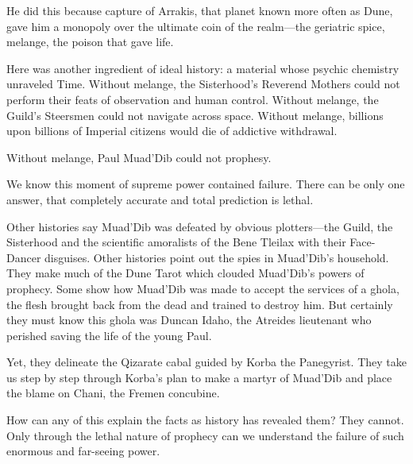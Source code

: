 \documentclass[a4paper, 12pt, oldfontcommands, final]{memoir}
\begin{document}
He did this because capture of Arrakis, that planet known more often as Dune, gave him a monopoly over the ultimate coin of the realm---the geriatric spice, melange, the poison that gave life.

Here was another ingredient of ideal history: a material whose psychic chemistry unraveled Time. Without melange, the Sisterhood's Reverend Mothers could not perform their feats of observation and human control. Without melange, the Guild’s Steersmen could not navigate across space. Without melange, billions upon billions of Imperial citizens would die of addictive withdrawal.

Without melange, Paul Muad'Dib could not prophesy.

We know this moment of supreme power contained failure. There can be only one answer, that completely accurate and total prediction is lethal.

Other histories say Muad'Dib was defeated by obvious plotters---the Guild, the Sisterhood and the scientific amoralists of the Bene Tleilax with their Face-Dancer disguises. Other histories point out the spies in Muad'Dib's household. They make much of the Dune Tarot which clouded Muad'Dib's powers of prophecy. Some show how Muad'Dib was made to accept the services of a ghola, the flesh brought back from the dead and trained to destroy him. But certainly they must know this ghola was Duncan Idaho, the Atreides lieutenant who perished saving the life of the young Paul.

Yet, they delineate the Qizarate cabal guided by Korba the Panegyrist. They take us step by step through Korba's plan to make a martyr of Muad'Dib and place the blame on Chani, the Fremen concubine.

How can any of this explain the facts as history has revealed them? They cannot. Only through the lethal nature of prophecy can we understand the failure of such enormous and far-seeing power.
\end{document}
